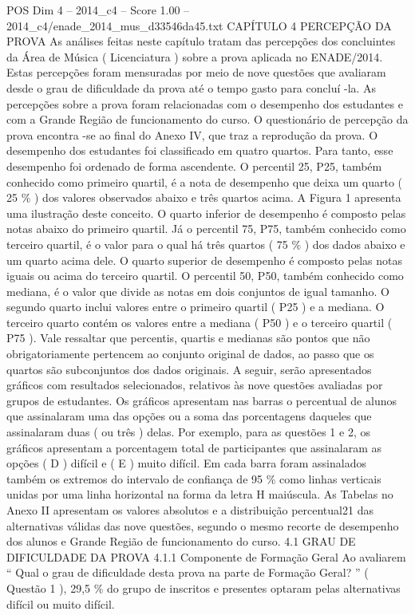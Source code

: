 \begin{textsample}{POS Dim 4 – 2014\_c4 – Score 1.00 – 2014\_c4/enade\_2014\_mus\_d33546da45.txt}  \label{ex:f4_pos_210}
CAPÍTULO 4 PERCEPÇÃO DA PROVA As análises feitas neste capítulo tratam das percepções dos concluintes da Área de Música ( Licenciatura ) sobre a prova aplicada no ENADE/2014.
Estas percepções foram mensuradas por meio de nove questões que avaliaram desde o grau de dificuldade da prova até o tempo gasto para concluí -la.
As percepções sobre a prova foram relacionadas com o desempenho dos estudantes e com a Grande Região de funcionamento do curso.
O questionário de percepção da prova encontra -se ao final do Anexo IV, que traz a reprodução da prova.
O desempenho dos estudantes foi classificado em quatro quartos.
Para tanto, esse desempenho foi ordenado de forma ascendente.
O percentil 25, P25, também conhecido como primeiro quartil, é a nota de desempenho que deixa um quarto ( 25 \% ) dos valores observados abaixo e três quartos acima.
A Figura 1 apresenta uma ilustração deste conceito.
O quarto inferior de desempenho é composto pelas notas abaixo do primeiro quartil.
Já o percentil 75, P75, também conhecido como terceiro quartil, é o valor para o qual há três quartos ( 75 \% ) dos dados abaixo e um quarto acima dele.
O quarto superior de desempenho é composto pelas notas iguais ou acima do terceiro quartil.
O percentil 50, P50, também conhecido como mediana, é o valor que divide as notas em dois conjuntos de igual tamanho.
O segundo quarto inclui valores entre o primeiro quartil ( P25 ) e a mediana.
O terceiro quarto contém os valores entre a mediana ( P50 ) e o terceiro quartil ( P75 ).
Vale ressaltar que percentis, quartis e medianas são pontos que não obrigatoriamente pertencem ao conjunto original de dados, ao passo que os quartos são subconjuntos dos dados originais.
A seguir, serão apresentados gráficos com resultados selecionados, relativos às nove questões avaliadas por grupos de estudantes.
Os gráficos apresentam nas barras o percentual de alunos que assinalaram uma das opções ou a soma das porcentagens daqueles que assinalaram duas ( ou três ) delas.
Por exemplo, para as questões 1 e 2, os gráficos apresentam a porcentagem total de participantes que assinalaram as opções ( D ) difícil e ( E ) muito difícil.
Em cada barra foram assinalados também os extremos do intervalo de confiança de 95 \% como linhas verticais unidas por uma linha horizontal na forma da letra H maiúscula.
As Tabelas no Anexo II apresentam os valores absolutos e a distribuição percentual21 das alternativas válidas das nove questões, segundo o mesmo recorte de desempenho dos alunos e Grande Região de funcionamento do curso. 4.1 GRAU DE DIFICULDADE DA PROVA 4.1.1 Componente de Formação Geral Ao avaliarem “ Qual o grau de dificuldade desta prova na parte de Formação Geral? ” ( Questão 1 ), 29,5 \% do grupo de inscritos e presentes optaram pelas alternativas difícil ou muito difícil.

\end{textsample}
